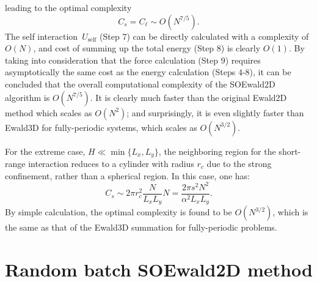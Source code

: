 leading to the optimal complexity
\begin{equation}\label{eq::70}
	C_{s} = C_{\ell} \sim O(N^{7/5}).
\end{equation}
The self interaction~$U_{\text{self}}$ (Step 7) can be directly calculated with a complexity of $O(N)$, and cost of summing up the total energy (Step 8) is clearly $O(1)$.
By taking into consideration that the force calculation (Step $9$) requires asymptotically the same cost as the energy calculation (Steps $4$-$8$), it can be concluded that the overall computational complexity of the SOEwald2D algorithm is $O(N^{7/5})$. 
It is clearly much faster than the original Ewald2D method which scales as $O(N^{2})$; and surprisingly, it is even slightly faster than Ewald3D for fully-periodic systems, which scales as $O(N^{3/2})$.

\begin{rmk}\label{rmk::extreme}
	For the extreme case, $H \ll \min\{L_x,L_y\}$, the neighboring region for the short-range interaction reduces to a cylinder with radius $r_c$ due to the strong confinement, rather than a spherical region. 
	In this case, one has:
	\begin{equation}
		C_{s}\sim 2\pi r_c^2 \frac{N}{L_x L_y} N=\frac{2\pi s^2N^2}{\alpha^2L_x L_y}.
	\end{equation}
	By simple calculation, the optimal complexity is found to be $O(N^{3/2})$, which is the same as that of the Ewald3D summation for fully-periodic problems. 
\end{rmk}


\section{Random batch SOEwald2D method} \label{sec:rbm}


